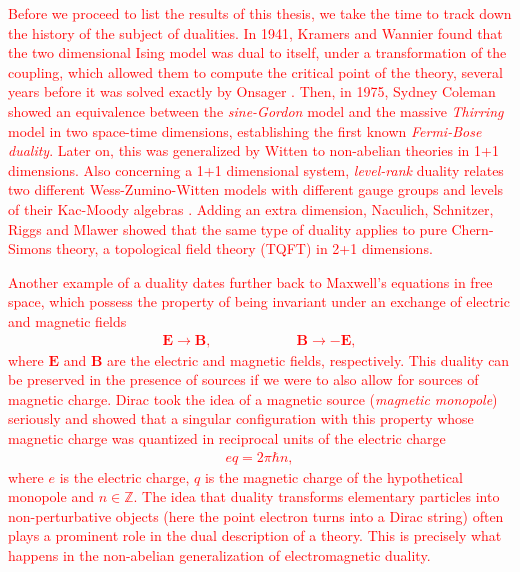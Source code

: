 \textcolor{red}{Before we proceed to list the results of this thesis, we take the time to track down the history of the subject of dualities. In 1941, Kramers and Wannier \cite{Kramers:1941kn} found that the two dimensional Ising model was dual to itself, under a transformation of the coupling, which allowed them to compute the critical point of the theory, several years before it was solved exactly by Onsager \cite{Onsager:1943jn}.  Then, in 1975, Sydney Coleman \cite{Coleman:1974bu} showed an equivalence between the \textit{sine-Gordon} model \cite{Scott1973} and the massive \textit{Thirring} model \cite{Thirring1958} in two space-time dimensions, establishing the first known \textit{Fermi-Bose duality}. Later on, this was generalized by Witten \cite{Witten:1983ar} to non-abelian theories in 1+1 dimensions. Also concerning a 1+1 dimensional system, \textit{level-rank} duality relates two different Wess-Zumino-Witten models with different gauge groups and levels of their Kac-Moody algebras \cite{Nakanishi:1990hj, Naculich:1990hg}. Adding an extra dimension, Naculich, Schnitzer, Riggs and Mlawer \cite{Mlawer:1990uv, Naculich:2007nc} showed that the same type of duality applies to pure Chern-Simons theory, a topological field theory (TQFT) in 2+1 dimensions. }

\textcolor{red}{Another example of a duality dates further back to Maxwell's equations in free space, which possess the property of being invariant under an exchange of electric and magnetic fields
\begin{align}
\bm{E}\rightarrow \bm{B}, \qquad\qquad\qquad \bm{B}\rightarrow -\bm{E},
\end{align}
where $\bm{E}$ and $\bm{B}$ are the electric and magnetic fields, respectively. This duality can be preserved in the presence of sources if we were to also allow for sources of magnetic charge. Dirac \cite{Dirac:1931kp} took the idea of a magnetic source (\textit{magnetic monopole}) seriously and showed that a singular configuration with this property whose magnetic charge was quantized in reciprocal units of the electric charge
\begin{align}
eq = 2\pi \hbar n,
\end{align}
where $e$ is the electric charge, $q$ is the magnetic charge of the hypothetical monopole and $n \in \mathbb{Z}$. The idea that duality transforms elementary particles into non-perturbative objects (here the point electron turns into a Dirac string) often plays a prominent role in the dual description of a theory. This is precisely what happens in the non-abelian generalization of electromagnetic duality.}


